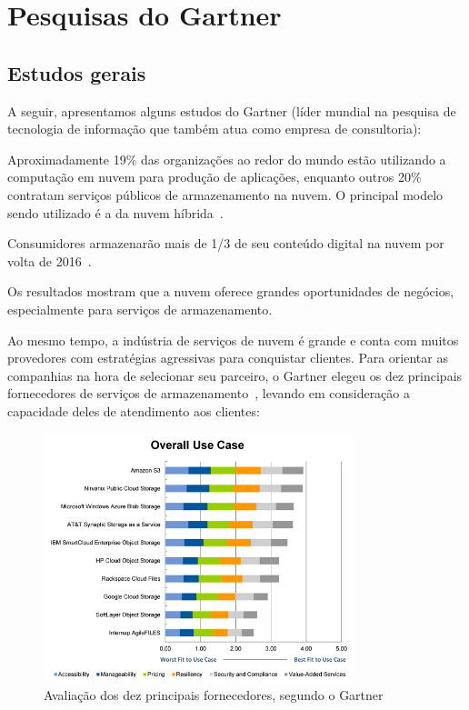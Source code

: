 \section{Pesquisas do Gartner}


\subsection{Estudos gerais}

A seguir, apresentamos alguns estudos do Gartner (líder mundial na
pesquisa de tecnologia de informação que também atua como empresa de consultoria):

\begin{itemise}

    \item Aproximadamente 19\% das organizações ao redor do mundo estão utilizando a
    computação em nuvem para produção de aplicações, enquanto outros 20\% contratam
    serviços públicos de armazenamento na nuvem. O principal modelo sendo utilizado é
    a da nuvem híbrida~\cite{gartner-public-cloud-services}.

    \item Consumidores armazenarão mais de 1/3 de seu conteúdo digital na nuvem por
    volta de 2016~\cite{gartner-one-third}.


\end{itemise}

Os resultados mostram que a nuvem oferece grandes oportunidades de negócios,
especialmente para serviços de armazenamento. 

Ao mesmo tempo, a indústria de serviços de nuvem é grande e conta com muitos 
provedores com estratégias agressivas para conquistar clientes. Para orientar as 
companhias na hora de selecionar seu parceiro, o Gartner elegeu os dez principais 
fornecedores de serviços de armazenamento~\cite{gartner-top-10}, levando em 
consideração a capacidade deles de atendimento aos clientes:

\begin{figure}[ht]
    \centering
    \includegraphics[width=0.8\textwidth]{img/top10.png}
    \caption{Avaliação dos dez principais fornecedores, segundo o Gartner}
\end{figure}


